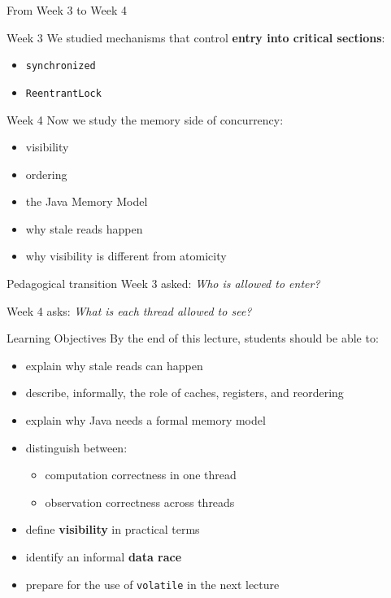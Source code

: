 \documentclass[aspectratio=169,11pt]{beamer}
\begin{document}
	\begin{frame}{From Week 3 to Week 4}
		\begin{block}{Week 3}
			We studied mechanisms that control \textbf{entry into critical sections}:
			\begin{itemize}
				\item \texttt{synchronized}
				\item \texttt{ReentrantLock}
			\end{itemize}
		\end{block}
		
		\vspace{0.25cm}
		
		\begin{block}{Week 4}
			Now we study the memory side of concurrency:
			\begin{itemize}
				\item visibility
				\item ordering
				\item the Java Memory Model
				\item why stale reads happen
				\item why visibility is different from atomicity
			\end{itemize}
		\end{block}
		
		\vspace{0.25cm}
		
		\begin{exampleblock}{Pedagogical transition}
			Week 3 asked: \emph{Who is allowed to enter?}
			
			Week 4 asks: \emph{What is each thread allowed to see?}
		\end{exampleblock}
	\end{frame}
	
	\begin{frame}{Learning Objectives}
		By the end of this lecture, students should be able to:
		
		\begin{itemize}
			\item explain why stale reads can happen
			\item describe, informally, the role of caches, registers, and reordering
			\item explain why Java needs a formal memory model
			\item distinguish between:
			\begin{itemize}
				\item computation correctness in one thread
				\item observation correctness across threads
			\end{itemize}
			\item define \textbf{visibility} in practical terms
			\item identify an informal \textbf{data race}
			\item prepare for the use of \texttt{volatile} in the next lecture
		\end{itemize}
	\end{frame}
	
\end{document}
